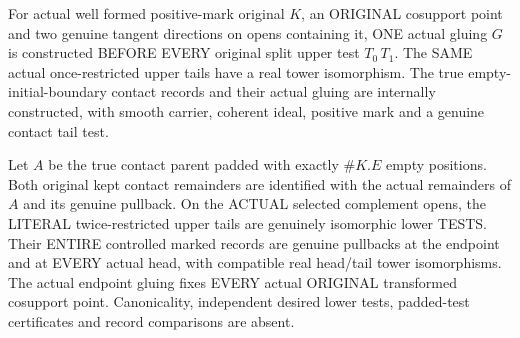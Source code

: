 \begin{theorem}
\label{hir:original-any-test-contact-choice-entire-lower-histories}
\leanok
For actual well formed positive-mark original $K$, an ORIGINAL cosupport
point and two genuine tangent directions on opens containing it, ONE actual
gluing $G$ is constructed BEFORE EVERY original split upper test
$T_0\,T_1$. The SAME actual once-restricted upper tails have a real tower
isomorphism. The true empty-initial-boundary contact records and their
actual gluing are internally constructed, with smooth carrier, coherent
ideal, positive mark and a genuine contact tail test.

Let $A$ be the true contact parent padded with exactly $\#K.E$ empty
positions. Both original kept contact remainders are identified with the
actual remainders of $A$ and its genuine pullback. On the ACTUAL selected
complement opens, the LITERAL twice-restricted upper tails are genuinely
isomorphic lower TESTS. Their ENTIRE controlled marked records are genuine
pullbacks at the endpoint and at EVERY actual head, with compatible real
head/tail tower isomorphisms. The actual endpoint gluing fixes EVERY actual
ORIGINAL transformed cosupport point. Canonicality, independent desired
lower tests, padded-test certificates and record comparisons are absent.
\end{theorem}
